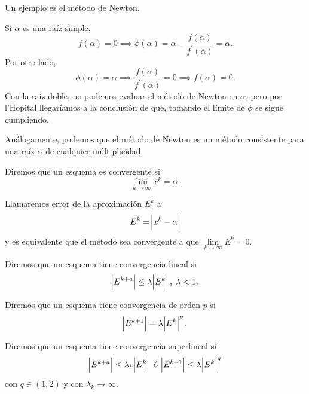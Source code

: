 \begin{ej}
    Un ejemplo es el método de Newton.

    Si $\alpha$ es una raíz simple,
    \[
        f(\alpha) = 0 \implies \phi(\alpha) = \alpha - \frac{f(\alpha)}{f^\prime(\alpha)} = \alpha.
    \]
    Por otro lado,
    \[
        \phi(\alpha) = \alpha \implies \frac{f(\alpha)}{f^\prime(\alpha)} = 0 \implies f(\alpha) = 0.
    \]
    Con la raíz doble, no podemos evaluar el método de Newton en $\alpha$, pero por l'Hopital llegaríamos
    a la conclusión de que, tomando el límite de $\phi$ se sigue cumpliendo.

    Análogamente, podemos que el método de Newton es un método consistente para una raíz $\alpha$ de
    cualquier múltiplicidad.
\end{ej}

\begin{defi}
    Diremos que un esquema es convergente si
    \[
        \lim_{k \to \infty} x^k = \alpha.
    \]
\end{defi}

\begin{obs}
    Llamaremos error de la aproximación $E^k$ a 
    \[
        E^k = \abs{x^k - \alpha}
    \]
    y es equivalente que el método sea convergente a que $\lim\limits_{k \to \infty} E^k = 0$.
\end{obs}

\begin{defi}
    Diremos que un esquema tiene convergencia lineal si
    \[
        \abs{E^{k+a}} \leq \lambda \abs{E^k}, \;\lambda < 1.
    \]
\end{defi}

\begin{defi}
    Diremos que un esquema tiene convergencia de orden $p$ si
    \[
        \abs{E^{k+1}} = \lambda \abs{E^k}^p.
    \]
\end{defi}

\begin{defi}
    Diremos que un esquema tiene convergencia superlineal si
    \[
        \abs{E^{k+a}} \leq \lambda_k \abs{E^k} \text{ ó }
        \abs{E^{k+1}} \leq \lambda \abs{E^k}^q
    \]
    con $q \in (1, 2)$ y con $\lambda_k \to \infty$.
\end{defi}
